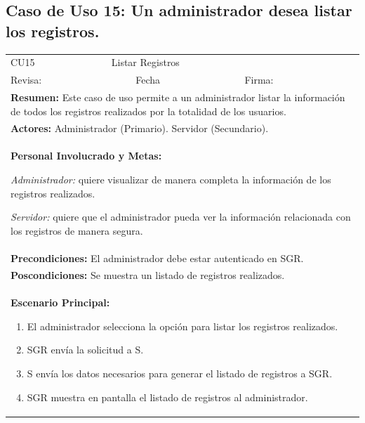 		\subsection{Caso de Uso 15: Un administrador desea listar los registros.}
			\begin{longtable}{|l|p{5.5cm}|l|p{2cm}|l|p{1.9cm}|} \hline
					\cellcolor{grisOscuro} CU15 & \multicolumn{4}{|l|}{  \cellcolor{grisOscuro} Listar Registros} &  \cellcolor{grisClaro}\multirow{2}{1cm}{} \\ \cline{1-5}
					\cellcolor{grisOscuro} Revisa: &  \cellcolor{grisClaro} &  \cellcolor{grisOscuro} Fecha &  \cellcolor{grisClaro} &  \cellcolor{grisOscuro} Firma: & \cellcolor{grisClaro} \\ \hline
					\multicolumn{6}{|p{15cm}|}{ \textbf{Resumen: } Este caso de uso permite a un administrador listar la información de todos los registros realizados por la totalidad de los usuarios.

					} \\ \hline

					\multicolumn{6}{|p{15cm}|}{ \textbf{Actores: } Administrador (Primario). Servidor (Secundario).

					} \\ \hline

					\multicolumn{6}{|p{15cm}|}{ \textbf{Personal Involucrado y Metas: }

					\emph{Administrador:} quiere visualizar de manera completa la información de los registros realizados.

					\emph{Servidor:} quiere que el administrador pueda ver la información relacionada con los registros de manera segura.

					} \\ \hline

					\multicolumn{6}{|p{15cm}|}{ \textbf{Precondiciones: } El administrador debe estar autenticado en SGR.

					} \\ \hline

					\multicolumn{6}{|p{15cm}|}{ \textbf{Poscondiciones: } Se muestra un listado de registros realizados.

					} \\ \hline

					\multicolumn{6}{|p{15cm}|}{ \textbf{Escenario Principal: }

					\begin{enumerate}
							\item El administrador selecciona la opción para listar los registros realizados.
							\item SGR envía la solicitud a S.
							\item S envía los datos necesarios para generar el listado de registros a SGR.
							\item SGR muestra en pantalla el listado de registros al administrador.
					\end{enumerate}

}
\end{longtable}

